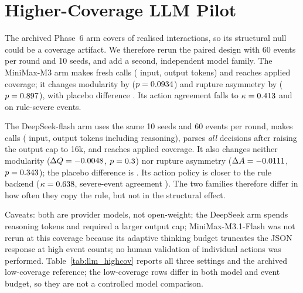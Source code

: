 \begin{table}[t]
\centering
\small
\caption{\textbf{Phase~6 placebo arm and per-event agreement.} The placebo arm deletes the
same number of random edges as the LLM arm's unfollow+block decisions. Agreement compares
the LLM decision with the rule counterfactual on the same event. Generated from
\texttt{results/phase6\_llm\_engine.json} by
\texttt{scripts/generate\_paper\_tables.py}.}
\label{tab:llm_placebo}

\end{table}

\section{Higher-Coverage LLM Pilot}
\label{app:llm-highcov}

The archived Phase~6 arm covers \LlmArmCoverage{} of realised interactions, so its structural
null could be a coverage artifact. We therefore rerun the paired design with 60 events per
round and 10 seeds, and add a second, independent model family. The MiniMax-M3 arm makes
\LlmHighCovApiCalls{} fresh calls (\LlmHighCovInputTokens{} input, \LlmHighCovOutputTokens{}
output tokens) and reaches \LlmHighCovCoverage{} applied coverage; it changes modularity by
\LlmHighCovQDelta{} ($p=0.0934$) and rupture asymmetry by \LlmHighCovRupDelta{}
($p=0.897$), with placebo difference \LlmHighCovPlaceboQDelta. Its action agreement
falls to $\kappa=0.413$ and \LlmHighCovSevereRate{} on rule-severe events.

The DeepSeek-flash arm uses the same 10 seeds and 60 events per round, makes
\LlmDeepSeekApiCalls{} calls (\LlmDeepSeekInputTokens{} input, \LlmDeepSeekOutputTokens{}
output tokens including reasoning), parses \emph{all} decisions after raising the output cap
to 16k, and reaches \LlmDeepSeekCoverage{} applied coverage. It also changes neither
modularity ($\Delta Q=-0.0048$, $p=0.3$) nor rupture asymmetry
($\Delta A=-0.0111$, $p=0.343$); the placebo difference is
\LlmDeepSeekPlaceboQDelta. Its action policy is closer to the rule backend
($\kappa=0.638$, severe-event agreement \LlmDeepSeekSevereRate). The two families
therefore differ in how often they copy the rule, but not in the structural effect.

Caveats: both are provider models, not open-weight; the DeepSeek arm spends reasoning tokens
and required a larger output cap; MiniMax-M3.1-Flash was not rerun at this coverage because
its adaptive thinking budget truncates the JSON response at high event counts; no human
validation of individual actions was performed. Table~\ref{tab:llm_highcov} reports all
three settings and the archived low-coverage reference; the low-coverage rows differ in both
model and event budget, so they are not a controlled model comparison.

